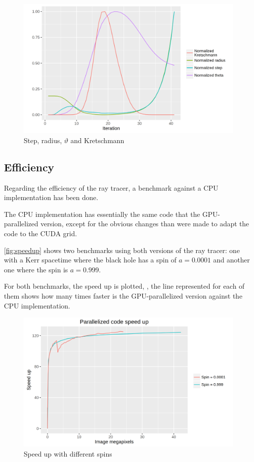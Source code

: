\begin{figure}[bth]
\myfloatalign
\includegraphics[width=1.2\linewidth]{gfx/kretschmann}
\caption[Step, $r$, $\vartheta$ and Kretschmann]{Step, radius, $\vartheta$ and Kretschmann}
\label{fig:kretschmann}
\end{figure}

\subsection{Efficiency}

Regarding the efficiency of the ray tracer, a benchmark against a \ac{CPU} implementation has been done.

The \ac{CPU} implementation has essentially the same code that the \ac{GPU}-parallelized version, except for the obvious changes than were made to adapt the code to the \ac{CUDA} grid.

\autoref{fig:speedup} shows two benchmarks using both versions of the ray tracer: one with a Kerr spacetime where the black hole has a spin of $a = 0.0001$ and another one where the spin is $a = 0.999$.

For both benchmarks, the speed up is plotted, \ie, the line represented for each of them shows how many times faster is the \ac{GPU}-parallelized version against the \ac{CPU} implementation.

\begin{figure}[bth]
	\myfloatalign
	\includegraphics[width=1.2\linewidth]{gfx/speedup}
	\caption[Speed up with different spins]{Speed up with different spins}
	\label{fig:speedup}
\end{figure}

